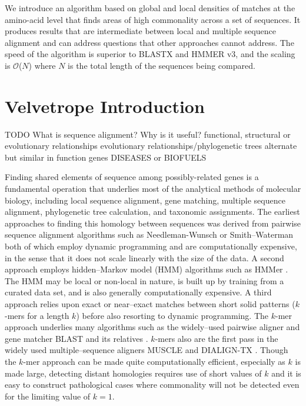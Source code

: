 \documentclass[phd,tocprelim]{cornell}
\begin{document}
We introduce an algorithm based on global and local densities of
matches at the amino-acid level that finds areas of high commonality
across a set of sequences.  It produces results that are intermediate
between local and multiple sequence alignment and can address
questions that other approaches cannot address.  The speed of the
algorithm is superior to BLASTX and HMMER v3, and the scaling is
$\mathcal{O}$($N$) where $N$ is the total length of the sequences
being compared.

\chapter{Velvetrope Introduction} %
\label{cha:Velvetrope Introduction}

TODO
What is sequence alignment? Why is it useful?
functional, structural or evolutionary relationships
evolutionary relationships/phylogenetic trees
alternate but similar in function genes
DISEASES or BIOFUELS

Finding shared elements of sequence among possibly-related genes is a
fundamental operation that underlies most of the analytical methods of
molecular biology, including local sequence alignment, gene matching,
multiple sequence alignment, phylogenetic tree calculation, and
taxonomic assignments. The earliest approaches to finding this homology
between sequences was derived from pairwise sequence alignment algorithms
such as Needleman-Wunsch \cite{Needleman70} or Smith--Waterman
\cite{SmithWaterman} both of which employ dynamic programming and
are computationally expensive, in the sense that it does not scale linearly with the size of the data. A second approach employs
hidden--Markov model (HMM) algorithms such as HMMer
\cite{Eddy98}. The HMM may be local or non-local in nature, is
built up by training from a curated data set, and is also generally
computationally expensive. A third approach relies upon exact or
near--exact matches between short solid patterns ($k$-mers for a length $k$) before also resorting to dynamic programming.  The
$k$-mer approach underlies many algorithms such as the widely--used
pairwise aligner and gene matcher BLAST \cite{BLAST} and its
relatives \cite{BLAT,Megablast,PSIBLAST}. $k$-mers also are the first pass in the widely used multiple--sequence aligners
MUSCLE \cite{MUSCLE} and DIALIGN-TX \cite{DIALIGN-TX}. Though the $k$-mer approach can be made quite computationally
efficient, especially as $k$ is made large, detecting distant
homologies requires use of short values of $k$ and it is easy to
construct pathological cases where commonality will not be detected
even for the limiting value of $k = 1$.
\end{document}
